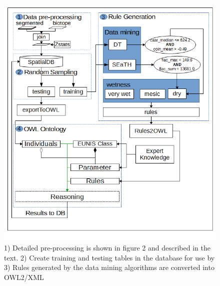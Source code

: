 \documentclass[authoryear, review,12pt,number]{elsarticle}
\begin{document}
\begin{figure}
	\includegraphics[width=1\linewidth]{diagrams/another_workflow_diagram_large.png}
	\caption{1) Detailed pre-processing is shown in figure 2 and described in the
	text.
	2) Create training and testing tables in the database for use by 3)  Rules
	generated by the data mining algorithms are converted into OWL2/XML }
\end{figure}
\end{document}
